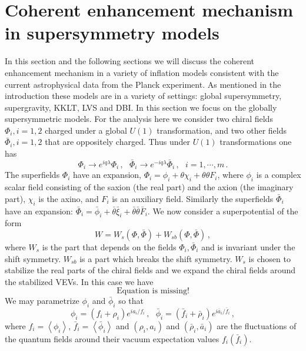 \documentclass[12pt]{article}
\begin{document}
\section{Coherent enhancement mechanism in supersymmetry models \label{sec:Supersymmetry}}
In this section and the following sections we will discuss the coherent enhancement mechanism in a variety of inflation models consistent with the current astrophysical data from the Planck experiment.
As mentioned in the introduction these models are in a variety of settings: global supersymmetry, supergravity, KKLT, LVS and DBI.
In this section we focus on the globally supersymmetric models.
For the analysis here we consider two chiral fields $\Phi_i, i = 1, 2$ charged under a global $U\left(1\right)$ transformation, and two other fields $\bar\Phi_i, i = 1, 2$ that are oppositely charged.
Thus under $U\left(1\right)$ transformations one has
\begin{equation}
  \Phi_i \to e^{i q \lambda} \Phi_i\,,
  ~~~ \bar\Phi_i \to e^{-i q \lambda} \bar\Phi_i\,,
  ~~~ i = 1, \cdots, m\,.
\end{equation}
The superfields $\Phi_i$ have an expansion, $\Phi_i = \phi_i + \theta \chi_i + \theta \theta F_i$, where $\phi_i$ is a complex scalar field consisting of the saxion (the real part) and the axion (the imaginary part), $\chi_i$ is the axino, and $F_i$ is an auxiliary field.
Similarly the superfields $\bar\Phi_i$ have an expansion: $\bar\Phi_i = \bar\phi_i + \bar\theta \bar\xi_i + \bar\theta \bar\theta \bar F_i$.
We now consider a superpotential of the form
\begin{equation} \label{eq:supersymmetry:W}
  W = W_s\left(\Phi, \bar\Phi\right) + W_{sb}\left(\Phi, \bar\Phi\right)\,,
\end{equation}
where $W_s$ is the part that depends on the fields $\Phi_i, \bar\Phi_i$ and is invariant under the shift symmetry.
$W_{sb}$ is a part which breaks the shift symmetry.
$W_s$ is chosen to stabilize the real parts of the chiral fields and we expand the chiral fields around the stabilized VEVs.
In this case we have
\begin{equation}
  \text{Equation is missing!}
\end{equation}
We may parametrize $\phi_i$ and $\bar\phi_i$ so that
\begin{equation}
  \phi_i = \left(f_i + \rho_i\right) e^{i a_i / f_i}\,,
  ~~~ \bar\phi_i = \left(\bar f_i + \bar\rho_i\right) e^{i \bar a_i / \bar f_i}\,,
\end{equation}
where $f_i = \left<\phi_i\right>$, $\bar f_i = \left<\bar\phi_i\right>$ and $\left(\rho_i, a_i\right)$ and $\left(\bar\rho_i, \bar a_i\right)$ are the fluctuations of the quantum fields around their vacuum expectation values $f_i\left(\bar f_i\right)$.
\end{document}

